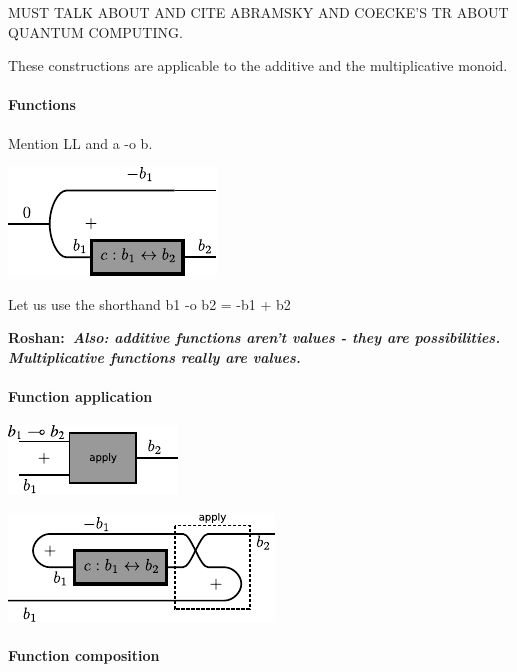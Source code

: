 \documentclass[preprint]{sigplanconf}
\newcommand{\xcomment}[2]{\textbf{#1:~\textsl{#2}}}
\newcommand{\roshan}[1]{\xcomment{Roshan}{#1}}
\begin{document}
MUST TALK ABOUT AND CITE ABRAMSKY AND COECKE'S TR ABOUT QUANTUM
COMPUTING.

These constructions are applicable to the additive and the
multiplicative monoid.

\paragraph*{Functions}

Mention LL and {{a -o b}}.

\begin{center}
  \includegraphics{diagrams/function.pdf}
\end{center}

Let us use the shorthand {{b1 -o b2 = -b1 + b2}}

\roshan{Also: additive functions aren't values - they are
  possibilities. Multiplicative functions really are values.}

\paragraph*{Function application}

\begin{center}
  \includegraphics{diagrams/apply1.pdf}
\end{center}

\begin{center}
  \includegraphics{diagrams/apply2.pdf}
\end{center}

\paragraph*{Function composition}
\end{document}
